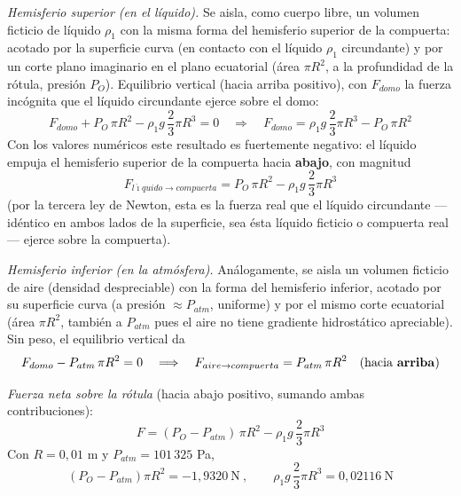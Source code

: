 \documentclass[11pt]{article}
\begin{document}
\textit{Hemisferio superior (en el l\'iquido).} Se aisla, como cuerpo libre, un volumen
ficticio de l\'iquido $\rho_1$ con la misma forma del hemisferio superior de la
compuerta: acotado por la superficie curva (en contacto con el l\'iquido $\rho_1$
circundante) y por un corte plano imaginario en el plano ecuatorial (\'area $\pi R^2$, a
la profundidad de la r\'otula, presi\'on $P_O$). Equilibrio vertical (hacia arriba
positivo), con $F_{domo}$ la fuerza inc\'ognita que el l\'iquido circundante ejerce
sobre el domo:
\begin{equation}
F_{domo}+P_O\,\pi R^2-\rho_1 g\,\frac23\pi R^3=0
\quad\Longrightarrow\quad
F_{domo}=\rho_1 g\,\frac23\pi R^3-P_O\,\pi R^2
\end{equation}
Con los valores num\'ericos este resultado es fuertemente negativo: el l\'iquido empuja
el hemisferio superior de la compuerta hacia \textbf{abajo}, con magnitud
\begin{equation}
F_{l\acute\imath quido\to compuerta}=P_O\,\pi R^2-\rho_1 g\,\frac23\pi R^3
\end{equation}
(por la tercera ley de Newton, esta es la fuerza real que el l\'iquido circundante
--- id\'entico en ambos lados de la superficie, sea \'esta l\'iquido ficticio o compuerta
real --- ejerce sobre la compuerta).

\textit{Hemisferio inferior (en la atm\'osfera).} An\'alogamente, se aisla un volumen
ficticio de aire (densidad despreciable) con la forma del hemisferio inferior, acotado
por su superficie curva (a presi\'on $\approx P_{atm}$, uniforme) y por el mismo corte
ecuatorial (\'area $\pi R^2$, tambi\'en a $P_{atm}$ pues el aire no tiene gradiente
hidrost\'atico apreciable). Sin peso, el equilibrio vertical da
\begin{equation}
F_{domo}-P_{atm}\,\pi R^2=0
\quad\Longrightarrow\quad
F_{aire\to compuerta}=P_{atm}\,\pi R^2\quad(\text{hacia \textbf{arriba}})
\end{equation}

\textit{Fuerza neta sobre la r\'otula} (hacia abajo positivo, sumando ambas
contribuciones):
\begin{equation}
\boxed{F=(P_O-P_{atm})\,\pi R^2-\rho_1 g\,\frac23\pi R^3}
\end{equation}
Con $R=0{,}01$ m y $P_{atm}=101\,325$ Pa,
\begin{equation}
(P_O-P_{atm})\pi R^2=-1{,}9320\ \text{N}\ ,\qquad
\rho_1 g\,\frac23\pi R^3=0{,}02116\ \text{N}
\end{equation}
\begin{center}
\end{center}
\end{document}
